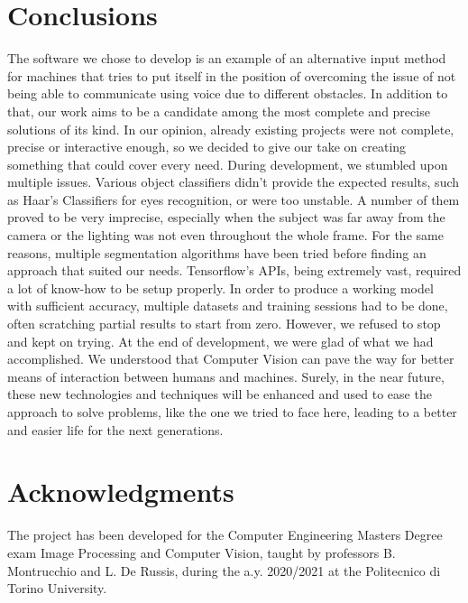 \documentclass[a4paper, 12pt]{article}
\begin{document}
\section{Conclusions}
\label{Conclusions}
The software we chose to develop is an example of an alternative input method for machines that tries to put itself in the position of overcoming the issue of not being able to communicate using voice due to different obstacles. In addition to that, our work aims to be a candidate among the most complete and precise solutions of its kind. In our opinion, already existing projects were not complete, precise or interactive enough, so we decided to give our take on creating something that could cover every need.\linebreak
During development, we stumbled upon multiple issues.
Various object classifiers didn't provide the expected results, such as Haar’s Classifiers for eyes recognition, or were too unstable. A number of them proved to be very imprecise, especially when the subject was far away from the camera or the lighting was not even throughout the whole frame.
For the same reasons, multiple segmentation algorithms have been tried before finding an approach that suited our needs.
Tensorflow's APIs, being extremely vast, required a lot of know-how to be setup properly. In order to produce a working model with sufficient accuracy, multiple datasets and training sessions had to be done, often scratching partial results to start from zero.
However, we refused to stop and kept on trying.
At the end of development, we were glad of what we had accomplished. We understood that Computer Vision can pave the way for better means of interaction between humans and machines.\linebreak
Surely, in the near future, these new technologies and techniques will be enhanced and used to ease the approach to solve problems, like the one we tried to face here, leading to a better and easier life for the next generations.

\section{Acknowledgments}
\label{Acks}
The project has been developed for the Computer Engineering Masters Degree exam Image Processing and Computer Vision, taught by professors B. Montrucchio and L. De Russis, during the a.y. 2020/2021 at the Politecnico di Torino University.

\onecolumn
\end{document}
